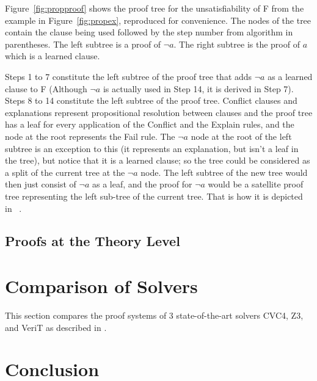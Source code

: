 \documentclass{article}
\begin{document}
Figure~\ref{fig:propproof} shows the proof tree for the 
unsatisfiability of F from the example in Figure~\ref{fig:propex}, 
reproduced for convenience. The nodes of the tree contain 
the clause being used followed by the step number from 
algorithm in parentheses. The left subtree is a proof of
$\neg a$. The right subtree is the proof of $a$ which is 
a learned clause.

Steps 1 to 7 constitute the left subtree of the proof tree that
adds $\neg a$ as a learned clause to F
(Although $\neg a$ is actually used in Step 14, 
it is derived in Step 7). Steps 8 to 14 constitute 
the left subtree of the proof tree.
Conflict clauses and explanations represent propositional resolution
between clauses and the proof tree has a leaf for every application 
of the Conflict and the Explain rules, and the node at the root 
represents the Fail rule. The $\neg a$ node at the root of the 
left subtree
is an exception to this (it represents an explanation, but isn't a leaf
in the tree), but notice that it is a learned clause; 
so the tree could be considered as a split of the current tree 
at the $\neg a$ node. The left subtree of the new tree 
would then just consist of $\neg a$ as a leaf, and the proof 
for $\neg a$ would be a satellite proof tree representing 
the left sub-tree of the current tree. That is how it is depicted 
in ~\cite{DBLP:conf/fmcad/KatzBTRH16}.

\subsection{Proofs at the Theory Level}
\label{sec:theoryproofs}

\section{Comparison of Solvers}
\label{sec:comp}
This section compares the proof systems of 3 state-of-the-art 
solvers CVC4, Z3, and VeriT as described in .

\section{Conclusion}
\label{sec:conc}



\end{document}
